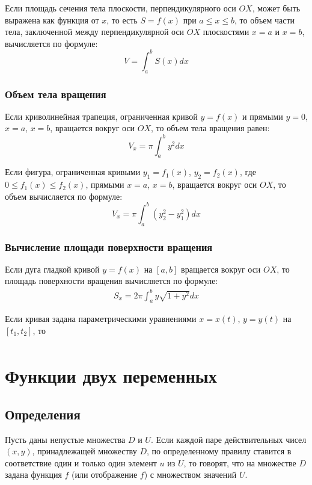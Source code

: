 \documentclass[a4paper,12pt,oneside]{extbook}
\theoremstyle{numbered}
\theoremstyle{unnumbered}
\theoremstyle{named}
\theoremstyle{unnumbered}
\theoremstyle{named}
\theoremstyle{named}
\theoremstyle{named}
\begin{document}
Если площадь сечения тела плоскости, перпендикулярного оси \(OX\), может быть выражена как функция от \(x\), то есть \(S = f(x)\) при \(a \leq x \leq b\), то объем части тела, заключенной между перпендикулярной оси \(OX\) плоскостями \(x = a\) и \(x = b\), вычисляется по формуле:
\[
    V = \int_a^b S(x) dx
\]

\subsection{Объем тела вращения}%
\label{sub:Объем тела вращения}

Если криволинейная трапеция, ограниченная кривой \(y = f(x)\) и прямыми \(y = 0\), \(x = a\), \(x = b\), вращается вокруг оси \(OX\), то объем тела вращения равен:
\[
    V_x = \pi \int_a^b y^2 dx
\]

Если фигура, ограниченная кривыми \(y_1 = f_1(x)\), \(y_2 = f_2(x)\), где \(0 \leq f_1(x) \leq f_2(x)\), прямыми \(x = a\), \(x = b\), вращается вокруг оси \(OX\), то объем вычисляется по формуле:
\[
    V_x = \pi \int_a^b (y_2^2 - y_1^2)dx
\]

\subsection{Вычисление площади поверхности вращения}%
\label{sub:Вычисление площади поверхности вращения}

Если дуга гладкой кривой \(y = f(x)\) на \([a, b]\) вращается вокруг оси \(OX\), то площадь поверхности вращения вычисляется по формуле:
\begin{gather*}
    S_x = 2\pi \int_a^b y\sqrt{1 + y^2}dx
\end{gather*}

Если кривая задана параметрическими уравнениями \(x = x(t)\), \(y = y(t)\) на \([t_1, t_2]\), то
\begin{gather*}
\end{gather*}

\chapter{Функции двух переменных}%
\label{cha:Функции двух переменных}

\section{Определения}%
\label{sec:Определения}

\begin{siderules}
    Пусть даны непустые множества \(D\) и \(U\). Если каждой паре действительных чисел \((x, y)\), принадлежащей множеству \(D\), по определенному правилу ставится в соответствие один и только один элемент \(u\) из \(U\), то говорят, что на множестве \(D\) задана функция \(f\) (или отображение \(f\)) с множеством значений \(U\).
\end{siderules}
\end{document}
